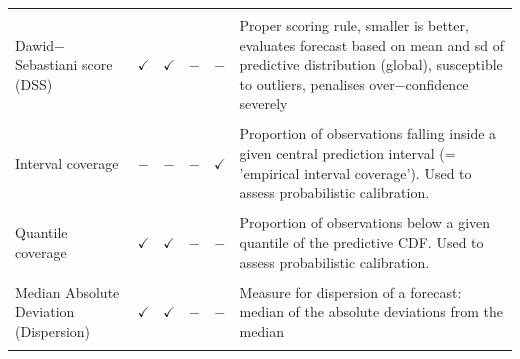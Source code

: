 \documentclass[
]{jss}
\begin{document}
\begin{CodeChunk}
\begin{longtable}[t]{>{\raggedright\arraybackslash}p{2.9cm}cccc>{\raggedright\arraybackslash}p{9.3cm}}
\cellcolor{gray!6}{(Weighted) interval score (WIS)} & \cellcolor{gray!6}{$\checkmark$} & \cellcolor{gray!6}{$\checkmark$} & \cellcolor{gray!6}{$-$} & \cellcolor{gray!6}{$\checkmark$} & \cellcolor{gray!6}{Proper scoring rule, smaller is better, similar properties to CRPS and converges to CRPS for an increasing number of equally spaced intervals}\\
\addlinespace
Dawid$-$Sebastiani score (DSS) & $\checkmark$ & $\checkmark$ & $-$ & $-$ & Proper scoring rule, smaller is better, evaluates forecast based on mean and sd of predictive distribution (global), susceptible to outliers, penalises over$-$confidence severely\\
\addlinespace
\cellcolor{gray!6}{Brier score (BS)} & \cellcolor{gray!6}{$-$} & \cellcolor{gray!6}{$-$} & \cellcolor{gray!6}{$\checkmark$} & \cellcolor{gray!6}{$-$} & \cellcolor{gray!6}{Proper scoring rule, smaller is better, equals CRPS for binary outcomes, penalises over$-$ and under$-$confidence similarly}\\
\addlinespace
Interval coverage & $-$ & $-$ & $-$ & $\checkmark$ & Proportion of observations falling inside a given central prediction interval (= 'empirical interval coverage'). Used to assess probabilistic calibration.\\
\addlinespace
\cellcolor{gray!6}{Coverage deviation} & \cellcolor{gray!6}{$-$} & \cellcolor{gray!6}{$-$} & \cellcolor{gray!6}{$-$} & \cellcolor{gray!6}{$\checkmark$} & \cellcolor{gray!6}{Average difference between empirical and nominal interval coverage (coverage that should have been realised)}\\
\addlinespace
Quantile coverage & $\checkmark$ & $\checkmark$ & $-$ & $-$ & Proportion of observations below a given quantile of the predictive CDF. Used to assess probabilistic calibration.\\
\addlinespace
\cellcolor{gray!6}{Dispersion} & \cellcolor{gray!6}{$-$} & \cellcolor{gray!6}{$-$} & \cellcolor{gray!6}{$-$} & \cellcolor{gray!6}{$\checkmark$} & \cellcolor{gray!6}{Dispersion component of WIS, measures width of predictive intervals.}\\
\addlinespace
Median Absolute Deviation (Dispersion) & $\checkmark$ & $\checkmark$ & $-$ & $-$ & Measure for dispersion of a forecast: median of the absolute deviations from the median\\
\addlinespace
\cellcolor{gray!6}{Under$-$, Over$-$prediction} & \cellcolor{gray!6}{$-$} & \cellcolor{gray!6}{$-$} & \cellcolor{gray!6}{$-$} & \cellcolor{gray!6}{$\checkmark$} & \cellcolor{gray!6}{Absolute amount of over$-$or under$-$prediction (components of WIS)}\\

\end{longtable}
\end{CodeChunk}
\end{document}
